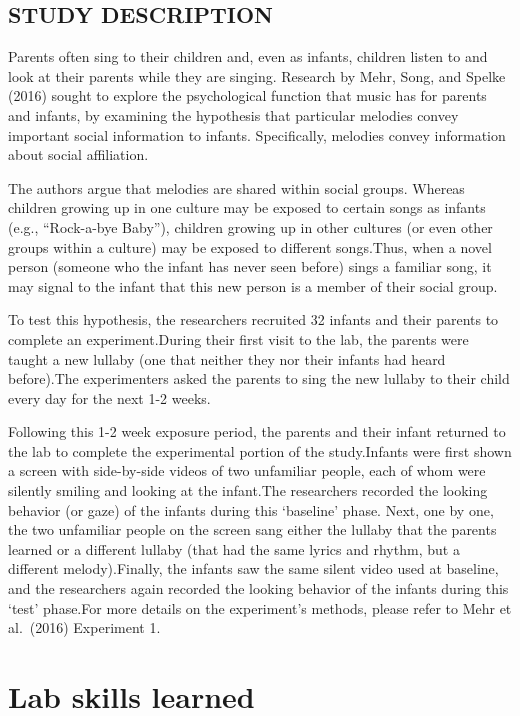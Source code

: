 \documentclass[
]{book}
\begin{document}
\hypertarget{study-description}{%
\subsection{STUDY DESCRIPTION}\label{study-description}}

Parents often sing to their children and, even as infants, children listen to and look at their parents while they are singing. Research by Mehr, Song, and Spelke (2016) sought to explore the psychological function that music has for parents and infants, by examining the hypothesis that particular melodies convey important social information to infants. Specifically, melodies convey information about social affiliation.

The authors argue that melodies are shared within social groups. Whereas children growing up in one culture may be exposed to certain songs as infants (e.g., ``Rock-a-bye Baby''), children growing up in other cultures (or even other groups within a culture) may be exposed to different songs.Thus, when a novel person (someone who the infant has never seen before) sings a familiar song, it may signal to the infant that this new person is a member of their social group.

To test this hypothesis, the researchers recruited 32 infants and their parents to complete an experiment.During their first visit to the lab, the parents were taught a new lullaby (one that neither they nor their infants had heard before).The experimenters asked the parents to sing the new lullaby to their child every day for the next 1-2 weeks.

Following this 1-2 week exposure period, the parents and their infant returned to the lab to complete the experimental portion of the study.Infants were first shown a screen with side-by-side videos of two unfamiliar people, each of whom were silently smiling and looking at the infant.The researchers recorded the looking behavior (or gaze) of the infants during this `baseline' phase. Next, one by one, the two unfamiliar people on the screen sang either the lullaby that the parents learned or a different lullaby (that had the same lyrics and rhythm, but a different melody).Finally, the infants saw the same silent video used at baseline, and the researchers again recorded the looking behavior of the infants during this `test' phase.For more details on the experiment's methods, please refer to Mehr et al.~(2016) Experiment 1.

\hypertarget{lab-skills-learned}{%
\section{Lab skills learned}\label{lab-skills-learned}}
\end{document}
